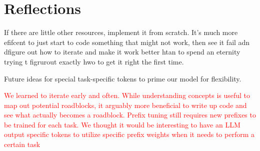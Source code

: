 \documentclass[11pt]{article} %
\begin{document}
\section{Reflections}

If there are little other resources, implement it from scratch. It's much more efifcent to just start to code something that might not work, then see it fail adn dfigure out how to iterate and make it work better htan to spend an eternity trying t figrurout exactly hwo to get it right the first time. 

Future ideas for special task-specific tokens to prime our model for flexibility.

\textcolor{red}{We learned to iterate early and often. While understanding concepts is useful to map out potential roadblocks, it arguably more beneficial to write up code and see what actually becomes a roadblock. Prefix tuning still requires new prefixes to be trained for each task. We thought it would be interesting to have an LLM output specific tokens to utilize specific prefix weights when it needs to perform a certain task}


\end{document}
